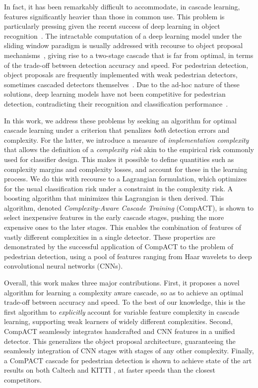 \documentclass[10pt,twocolumn,letterpaper]{article}
\begin{document}
In fact, it has been remarkably difficult to accommodate, in cascade
learning, features significantly heavier than those in common use.
This problem is particularly pressing given the recent success of deep
learning in object
recognition~\cite{DBLP:conf/nips/KrizhevskySH12,DBLP:journals/corr/SimonyanZ14a}.
The intractable computation of a deep learning model under the sliding
window paradigm is usually addressed with recourse to object proposal
mechanisms~\cite{DBLP:conf/iccv/SandeUGS11}, giving rise to a two-stage
cascade that is far from optimal, in terms of the trade-off between detection
accuracy and speed. For pedestrian detection, object proposals are
frequently implemented with weak pedestrian detectors, sometimes cascaded
detectors themselves~\cite{DBLP:journals/corr/HosangOBS15}. Due to the ad-hoc
nature of these solutions, deep learning models have not been competitive
for pedestrian detection, contradicting their recognition and
classification performance~\cite{DBLP:conf/nips/KrizhevskySH12,
DBLP:journals/corr/SimonyanZ14a}.

In this work, we address these problems by seeking an algorithm for optimal
cascade learning under a criterion that penalizes {\it both\/} detection errors
and complexity. For the latter, we introduce a  measure of {\it implementation
complexity\/} that allows the definition of a {\it complexity risk\/}
akin to the empirical risk commonly used for classifier design.
This makes it possible to define quantities such as complexity margins and
complexity losses, and account for these in the learning process. We do this
with recourse to a Lagrangian formulation, which optimizes for the usual
classification risk under a constraint in the complexity risk. A boosting
algorithm that minimizes this Lagrangian is then derived. This algorithm,
denoted {\it Complexity-Aware Cascade Training\/} (CompACT), is shown to
select inexpensive features in the early cascade stages, pushing the
more expensive ones to the later stages. This enables the
combination of features of vastly different complexities in a single detector.
These properties are demonstrated by the successful application of CompACT to
the problem of pedestrian detection, using a pool of features
ranging from Haar wavelets to deep convolutional neural networks (CNNs).



Overall, this work makes three major contributions. First, it proposes a
novel algorithm for learning a complexity aware cascade, so as to achieve
an optimal trade-off between accuracy and speed. To the best of our
knowledge, this is the first algorithm to {\it explicitly\/} account for
variable feature complexity in cascade learning, supporting weak
learners of widely different complexities. Second, CompACT seamlessly
integrates handcrafted and CNN features in a unified detector.
This generalizes the object proposal architecture, guaranteeing
the seamlessly integration of CNN stages with stages of
any other complexity. Finally, a ComPACT cascade for pedestrian detection
is shown to achieve state of the art results on both
Caltech \cite{DBLP:journals/pami/DollarWSP12} and
KITTI \cite{DBLP:conf/cvpr/GeigerLU12}, at faster speeds than
the closest competitors.
\end{document}

